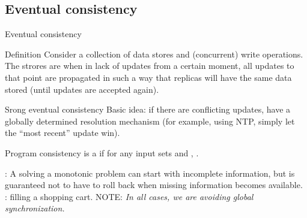 \subsection{Eventual consistency}
\begin{slide}{Eventual consistency}
  \begin{block}{Definition}
    Consider a collection of data stores and (concurrent) write operations. The strores are  when in lack of updates from a certain moment, all updates to that point are propagated in
    such a way that replicas will have the same data stored (until updates are accepted again).
  \end{block}

  \begin{block}{Srong eventual consistency}
    Basic idea: if there are conflicting updates, have a globally determined resolution mechanism (for
    example, using NTP, simply let the ``most recent'' update win). 
  \end{block}

  \begin{block}{Program consistency}
     is a  if for any input sets  and ,
    .

    : A  solving a monotonic problem can start with incomplete information, but
    is guaranteed not to have to roll back when missing information becomes available. :
    filling a shopping cart.
    NOTE: \emph{In all cases, we are avoiding global 
    synchronization.}
  \end{block}
\end{slide}
